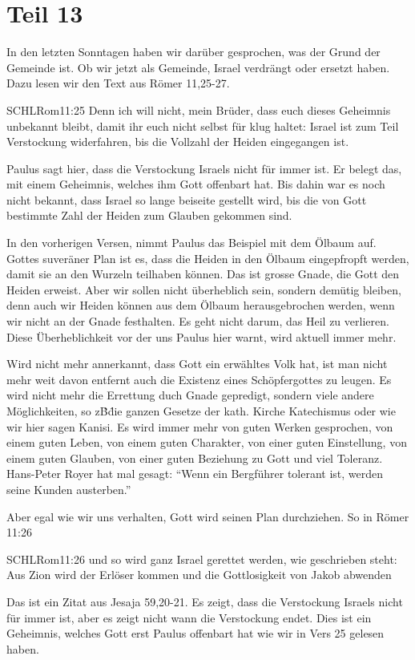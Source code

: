 \section{Teil 13}
\begin{otsblock}
        In den letzten Sonntagen haben wir darüber gesprochen, was der Grund der Gemeinde ist. Ob wir jetzt als Gemeinde, Israel verdrängt oder ersetzt haben. Dazu lesen wir den Text aus Römer 11,25-27.
        \begin{bibelbox}{SCHL}{Rom}{11:25}
            Denn ich will nicht, mein Brüder, dass euch dieses Geheimnis unbekannt bleibt, damit ihr euch nicht selbst für klug haltet: Israel ist zum Teil Verstockung widerfahren, bis die Vollzahl der Heiden eingegangen ist.
        \end{bibelbox}
        Paulus sagt hier, dass die Verstockung Israels nicht für immer ist. Er belegt das, mit einem Geheimnis, welches ihm Gott offenbart hat. Bis dahin war es noch nicht bekannt, dass Israel so lange beiseite gestellt wird, bis die von Gott bestimmte Zahl der Heiden zum Glauben gekommen sind.

        In den vorherigen Versen, nimmt Paulus das Beispiel mit dem Ölbaum auf. Gottes suveräner Plan ist es, dass die Heiden in den Ölbaum eingepfropft werden, damit sie an den Wurzeln teilhaben können. Das ist  grosse Gnade, die Gott den Heiden erweist. Aber wir sollen nicht überheblich sein, sondern demütig bleiben, denn auch wir Heiden können aus dem Ölbaum herausgebrochen werden, wenn wir nicht an der Gnade festhalten. Es geht nicht darum, das Heil zu verlieren. Diese Überheblichkeit vor der uns Paulus hier warnt, wird aktuell immer mehr. 
        
        Wird nicht mehr annerkannt, dass Gott ein erwähltes Volk hat, ist man nicht mehr weit davon entfernt auch die Existenz eines Schöpfergottes zu leugen. Es wird nicht mehr die Errettung duch Gnade gepredigt, sondern viele andere Möglichkeiten, so z\.B\. die ganzen Gesetze der kath. Kirche Katechismus oder wie wir hier sagen Kanisi. Es wird immer mehr von guten Werken gesprochen, von einem guten Leben, von einem guten Charakter, von einer guten Einstellung, von einem guten Glauben, von einer guten Beziehung zu Gott und viel Toleranz. Hans-Peter Royer hat mal gesagt: \enquote{Wenn ein Bergführer tolerant ist, werden seine Kunden austerben.}

        Aber egal wie wir uns verhalten, Gott wird seinen Plan durchziehen. So in Römer 11:26
        \begin{bibelbox}{SCHL}{Rom}{11:26}
            und so wird ganz Israel gerettet werden, wie geschrieben steht: Aus Zion wird der Erlöser kommen und die Gottlosigkeit von Jakob abwenden
        \end{bibelbox}
        Das ist ein Zitat aus Jesaja 59,20-21. Es zeigt, dass die Verstockung Israels nicht für immer ist, aber es zeigt nicht wann die Verstockung endet. Dies ist ein Geheimnis, welches Gott erst Paulus offenbart hat wie wir in Vers 25 gelesen haben.        
        \end{otsblock}

